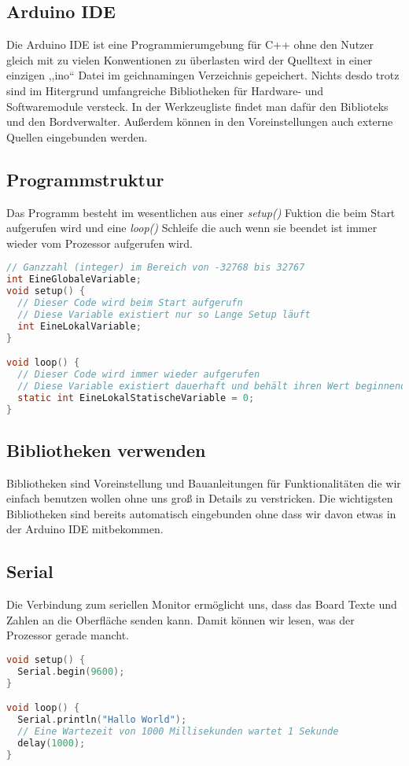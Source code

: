 \subsection{\large{Arduino IDE}}
Die Arduino IDE ist eine Programmierumgebung für C++ ohne den Nutzer gleich mit zu vielen Konwentionen zu überlasten wird der Quelltext in einer einzigen ,,ino`` Datei im geichnamingen Verzeichnis gepeichert. Nichts desdo trotz sind im Hitergrund umfangreiche Bibliotheken für Hardware- und Softwaremodule versteck. In der Werkzeugliste findet man dafür den Biblioteks und den Bordverwalter. Außerdem können in den Voreinstellungen auch externe Quellen eingebunden werden.\\
\subsection{\large{Programmstruktur}}
Das Programm besteht im wesentlichen aus einer \textit{setup()} Fuktion die beim Start aufgerufen wird und eine \textit{loop()} Schleife die auch wenn sie beendet ist immer wieder vom Prozessor aufgerufen wird.\\
\begin{lstlisting}[language=c, caption=Beispiel]
// Ganzzahl (integer) im Bereich von -32768 bis 32767 
int EineGlobaleVariable; 
void setup() {
  // Dieser Code wird beim Start aufgerufn
  // Diese Variable existiert nur so Lange Setup läuft
  int EineLokalVariable;  
}

void loop() {
  // Dieser Code wird immer wieder aufgerufen
  // Diese Variable existiert dauerhaft und behält ihren Wert beginnend mit 0
  static int EineLokalStatischeVariable = 0; 
}
\end{lstlisting}
\subsection{\large{Bibliotheken verwenden}}
Bibliotheken sind Voreinstellung und Bauanleitungen für Funktionalitäten die wir einfach benutzen wollen ohne uns groß in Details zu verstricken. Die wichtigsten Bibliotheken sind bereits automatisch eingebunden ohne dass wir davon etwas in der Arduino IDE mitbekommen.
\subsection{Serial}
Die Verbindung zum seriellen Monitor ermöglicht uns, dass das Board Texte und Zahlen an die Oberfläche senden kann. Damit können wir lesen, was der Prozessor gerade mancht. 
\begin{lstlisting}[language=c, caption=Beispiel]
void setup() {
  Serial.begin(9600);
}

void loop() {
  Serial.println("Hallo World");
  // Eine Wartezeit von 1000 Millisekunden wartet 1 Sekunde    
  delay(1000);        
}
\end{lstlisting}

